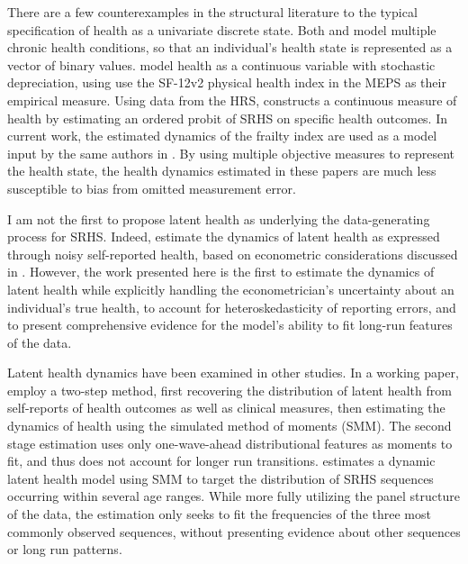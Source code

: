 \documentclass[12pt,pdftex,letterpaper]{article}
\begin{document}
There are a few counterexamples in the structural literature to the typical specification of health as a univariate discrete state. Both \cite{YangGilleskie09} and \cite{DardenGilleskie18} model multiple chronic health conditions, so that an individual's health state is represented as a vector of binary values. \cite{JungTran16} model health as a continuous variable with stochastic depreciation, using use the SF-12v2 physical health index in the MEPS as their empirical measure. Using data from the HRS, \cite{White18} constructs a continuous measure of health by estimating an ordered probit of SRHS on specific health outcomes. In current work, the estimated dynamics of the frailty index are used as a model input by the same authors in \cite{HosseiniZhao21b}. By using multiple objective measures to represent the health state, the health dynamics estimated in these papers are much less susceptible to bias from omitted measurement error.

I am not the first to propose latent health as underlying the data-generating process for SRHS. Indeed, \cite{BoundStinebrickner10} estimate the dynamics of latent health as expressed through noisy self-reported health, based on econometric considerations discussed in \cite{Bound91}. However, the work presented here is the first to estimate the dynamics of latent health while explicitly handling the econometrician's uncertainty about an individual's true health, to account for heteroskedasticity of reporting errors, and to present comprehensive evidence for the model's ability to fit long-run features of the data.  

Latent health dynamics have been examined in other studies. In a working paper, \cite{Lange12} employ a two-step method, first recovering the distribution of latent health from self-reports of health outcomes as well as clinical measures, then estimating the dynamics of health using the simulated method of moments (SMM).  The second stage estimation uses only one-wave-ahead distributional features as moments to fit, and thus does not account for longer run transitions.  \cite{Halliday11} estimates a dynamic latent health model using SMM to target the distribution of SRHS sequences occurring within several age ranges.  While more fully utilizing the panel structure of the data, the estimation only seeks to fit the frequencies of the three most commonly observed sequences, without presenting evidence about other sequences or long run patterns.
\end{document}
